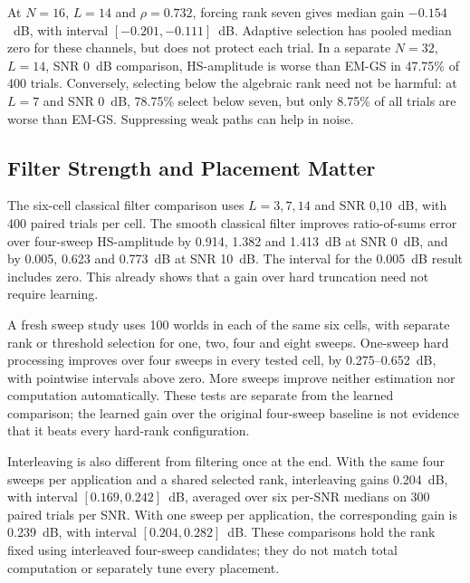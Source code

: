\documentclass[10pt,journal,letterpaper]{IEEEtran}
\begin{document}
At $N=16$, $L=14$ and $\rho=0.732$, forcing rank seven gives median gain $-0.154$~dB, with interval $[-0.201,-0.111]$~dB. Adaptive selection has pooled median zero for these channels, but does not protect each trial. In a separate $N=32$, $L=14$, SNR 0~dB comparison, HS-amplitude is worse than EM-GS in 47.75\% of 400 trials. Conversely, selecting below the algebraic rank need not be harmful: at $L=7$ and SNR 0~dB, 78.75\% select below seven, but only 8.75\% of all trials are worse than EM-GS. Suppressing weak paths can help in noise.

\subsection{Filter Strength and Placement Matter}
The six-cell classical filter comparison uses $L=3,7,14$ and SNR 0,10~dB, with 400 paired trials per cell. The smooth classical filter improves ratio-of-sums error over four-sweep HS-amplitude by 0.914, 1.382 and 1.413~dB at SNR 0~dB, and by 0.005, 0.623 and 0.773~dB at SNR 10~dB. The interval for the 0.005~dB result includes zero. This already shows that a gain over hard truncation need not require learning.

A fresh sweep study uses 100 worlds in each of the same six cells, with separate rank or threshold selection for one, two, four and eight sweeps. One-sweep hard processing improves over four sweeps in every tested cell, by 0.275--0.652~dB, with pointwise intervals above zero. More sweeps improve neither estimation nor computation automatically. These tests are separate from the learned comparison; the learned gain over the original four-sweep baseline is not evidence that it beats every hard-rank configuration.

Interleaving is also different from filtering once at the end. With the same four sweeps per application and a shared selected rank, interleaving gains 0.204~dB, with interval $[0.169,0.242]$~dB, averaged over six per-SNR medians on 300 paired trials per SNR. With one sweep per application, the corresponding gain is 0.239~dB, with interval $[0.204,0.282]$~dB. These comparisons hold the rank fixed using interleaved four-sweep candidates; they do not match total computation or separately tune every placement.
\end{document}
